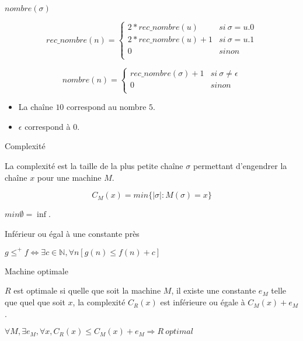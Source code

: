 \begin{definition}{$nombre(\sigma)$}
\par $$ rec\_nombre(n) = 
			\left \{
				\begin{array}{ll}
					2*rec\_nombre(u) & si~ \sigma = u.0 \\
					2*rec\_nombre(u)+1 & si~ \sigma = u.1 \\
					0 &sinon \\
				\end{array}
			\right.
	$$
\par $$ nombre(n) = 
			\left \{
				\begin{array}{ll}
					rec\_nombre(\sigma)+1 & si~ \sigma \not= \epsilon \\
					0 & sinon \\
				\end{array}
			\right.
	$$
\end{definition}

\begin{example}
\begin{itemize}
\item La chaîne $10$ correspond au nombre $5$.
\item $\epsilon$ correspond à $0$.
\end{itemize}
\end{example}

\begin{definition}{Complexité}
\par La complexité est la taille de la plus petite chaîne $\sigma$ permettant d'engendrer la chaîne $x$ pour une machine $M$.
\par $$C_M(x) = min\{|\sigma|:M(\sigma) = x\}$$
\par $min \emptyset = \inf$.
\end{definition}

\begin{definition}Inférieur ou égal à une constante près
\par $g \leqslant^+ f \iff \exists c \in \mathbb{N}, \forall n [g(n) \leqslant f(n) + c]$
\end{definition}


\begin{definition}{Machine optimale}
\par $R$ est optimale si quelle que soit la machine $M$, il existe une constante $e_M$ telle que quel que soit $x$, la complexité $C_R(x)$ est inférieure ou égale à $C_M(x) + e_M$.
\par $\forall M, \exists e_M, \forall x, C_R(x) \leqslant C_M(x) + e_M \Rightarrow R~ optimal$
\end{definition}

